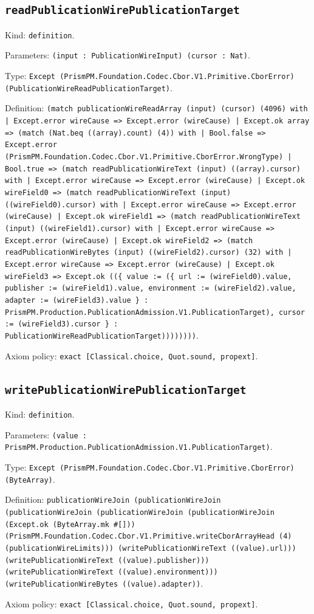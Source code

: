 \documentclass[11pt]{article}
\begin{document}
\subsection*{\texttt{readPublicationWirePublicationTarget}}
\noindent Kind: \texttt{definition}.\par
\noindent Parameters: \texttt{(input : PublicationWireInput) (cursor : Nat)}.\par
\noindent Type: \texttt{Except (PrismPM.Foundation.Codec.Cbor.V1.Primitive.CborError) (PublicationWireReadPublicationTarget)}.\par
\noindent Definition: \texttt{(match publicationWireReadArray (input) (cursor) (4096) with | Except.error wireCause => Except.error (wireCause) | Except.ok array => (match (Nat.beq ((array).count) (4)) with | Bool.false => Except.error (PrismPM.Foundation.Codec.Cbor.V1.Primitive.CborError.WrongType) | Bool.true => (match readPublicationWireText (input) ((array).cursor) with | Except.error wireCause => Except.error (wireCause) | Except.ok wireField0 => (match readPublicationWireText (input) ((wireField0).cursor) with | Except.error wireCause => Except.error (wireCause) | Except.ok wireField1 => (match readPublicationWireText (input) ((wireField1).cursor) with | Except.error wireCause => Except.error (wireCause) | Except.ok wireField2 => (match readPublicationWireBytes (input) ((wireField2).cursor) (32) with | Except.error wireCause => Except.error (wireCause) | Except.ok wireField3 => Except.ok ((\{ value := (\{ url := (wireField0).value, publisher := (wireField1).value, environment := (wireField2).value, adapter := (wireField3).value \} : PrismPM.Production.PublicationAdmission.V1.PublicationTarget), cursor := (wireField3).cursor \} : PublicationWireReadPublicationTarget))))))))}.\par
\noindent Axiom policy: \texttt{exact [Classical.choice, Quot.sound, propext]}.\par
\subsection*{\texttt{writePublicationWirePublicationTarget}}
\noindent Kind: \texttt{definition}.\par
\noindent Parameters: \texttt{(value : PrismPM.Production.PublicationAdmission.V1.PublicationTarget)}.\par
\noindent Type: \texttt{Except (PrismPM.Foundation.Codec.Cbor.V1.Primitive.CborError) (ByteArray)}.\par
\noindent Definition: \texttt{publicationWireJoin (publicationWireJoin (publicationWireJoin (publicationWireJoin (publicationWireJoin (Except.ok (ByteArray.mk \#[])) (PrismPM.Foundation.Codec.Cbor.V1.Primitive.writeCborArrayHead (4) (publicationWireLimits))) (writePublicationWireText ((value).url))) (writePublicationWireText ((value).publisher))) (writePublicationWireText ((value).environment))) (writePublicationWireBytes ((value).adapter))}.\par
\noindent Axiom policy: \texttt{exact [Classical.choice, Quot.sound, propext]}.\par
\end{document}
